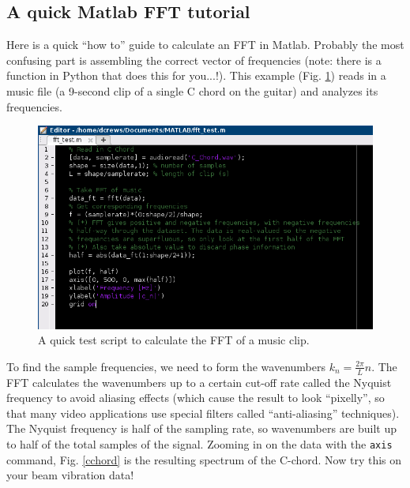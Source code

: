 \documentclass[12pt]{article}
\begin{document}
\subsection{A quick Matlab FFT tutorial}
Here is a quick ``how to'' guide to calculate an FFT in Matlab. Probably the most confusing part is assembling the correct vector of frequencies (note: there is a function in Python that does this for you...!). This example (Fig. \ref{fftex}) reads in a music file (a 9-second clip of a single C chord on the guitar) and analyzes its frequencies.
\begin{figure}[h]
  \centering
  \includegraphics[width=\textwidth]{Fourier/matlab_fft_test}
  \caption{A quick test script to calculate the FFT of a music clip.}\label{fftex}
\end{figure}
To find the sample frequencies, we need to form the wavenumbers $k_n = \frac{2\pi}{L}n$. The FFT calculates the wavenumbers up to a certain cut-off rate called the Nyquist frequency to avoid aliasing effects (which cause the result to look ``pixelly'', so that many video applications use special filters called ``anti-aliasing'' techniques). The Nyquist frequency is half of the sampling rate, so wavenumbers are built up to half of the total samples of the signal. Zooming in on the data with the \texttt{axis} command, Fig. \ref{cchord} is the resulting spectrum of the C-chord. Now try this on your beam vibration data!
\end{document}
